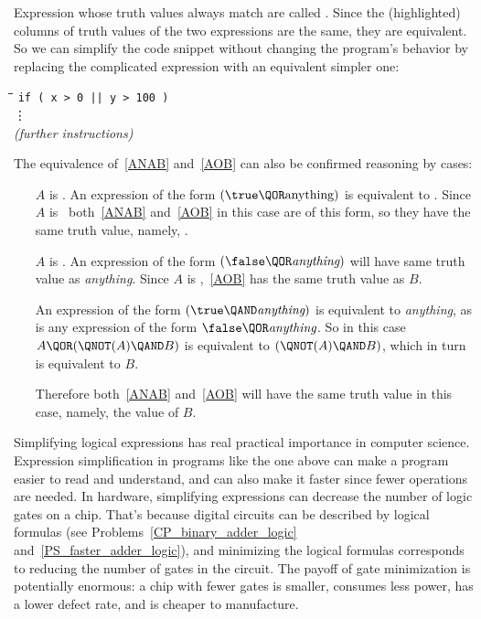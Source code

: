 Expression whose truth values always match are called .
Since the (highlighted) columns of truth values of the two expressions are
the same, they are equivalent.  So we can simplify the code snippet
without changing the program's behavior by replacing the complicated
expression with an equivalent simpler one:
%
\begin{tabbing}
\hspace{1in} \= \quad\quad \= \quad\quad \= \quad\quad \= \kill
\> \texttt{if ( x > 0 || y > 100 )} \\
\> \> \vdots\\
\> \emph{(further instructions)}
\end{tabbing}

The equivalence of~\eqref{ANAB} and~\eqref{AOB} can also be confirmed
reasoning by cases:
\begin{itemize}
\item[$A$ is \true.]  An expression of the form $(\true \QOR
  \text{anything})$ is equivalent to \true.  Since $A$ is \true\
  both~\eqref{ANAB} and~\eqref{AOB} in this case are of this form, so they
  have the same truth value, namely, \true.

\item[$A$ is \false.]  An expression of the form $(\false \QOR
  \textit{anything})$ will have same truth value as \emph{anything}.
  Since $A$ is \false,~\eqref{AOB} has the same truth value as $B$.

   An expression of the form $(\true \QAND \textit{anything})$ is
   equivalent to \emph{anything}, as is any expression of the form
   $\false \QOR \emph{anything}$.  So in this case $A \QOR (\QNOT(A)
   \QAND B)$ is equivalent to $(\QNOT(A) \QAND B)$, which in turn is
   equivalent to $B$.

   Therefore both~\eqref{ANAB} and~\eqref{AOB} will have the same truth
   value in this case, namely, the value of $B$.
\end{itemize}

Simplifying logical expressions has real practical importance in
computer science.  Expression simplification in programs like the one
above can make a program easier to read and understand, and can also
make it faster since fewer operations are needed.  In hardware,
simplifying expressions can decrease the number of logic gates on a
chip.  That's because digital circuits can be described by logical
formulas (see Problems~\ref{CP_binary_adder_logic}
and~\ref{PS_faster_adder_logic}), and minimizing the logical formulas
corresponds to reducing the number of gates in the circuit.  The
payoff of gate minimization is potentially enormous: a chip with fewer
gates is smaller, consumes less power, has a lower defect rate, and is
cheaper to manufacture.

